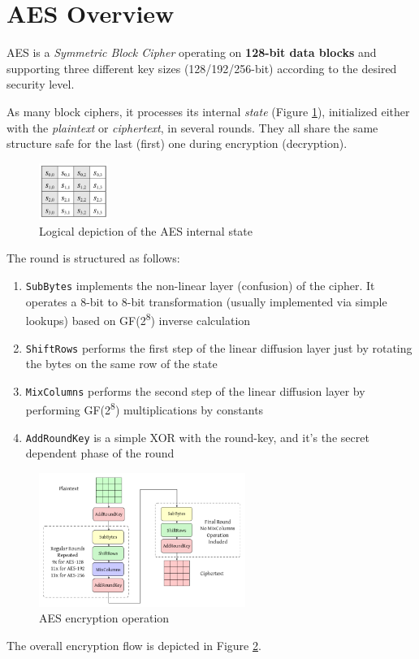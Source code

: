 \section{AES Overview}

AES is a \textit{Symmetric Block Cipher} operating on \textbf{128-bit data blocks}
and supporting three different key sizes (128/192/256-bit) according to the desired
security level.

As many block ciphers, it processes its internal \textit{state} (Figure \ref{fig:state}), initialized either with the
\textit{plaintext} or \textit{ciphertext}, in several rounds. They all share the same
structure safe for the last (first) one during encryption (decryption).

\begin{figure}[h]
  \centering
  \includegraphics[width=0.2\textwidth]{figures/aes_state}
  \caption{Logical depiction of the AES internal state}
  \label{fig:state}
  \centering
\end{figure}

The round is structured as follows:
\begin{enumerate}
  \item \texttt{SubBytes} implements the non-linear layer (confusion) of the cipher. It
operates a 8-bit to 8-bit transformation (usually implemented via simple lookups)
based on GF(2\textsuperscript{8}) inverse calculation
  \item \texttt{ShiftRows} performs the first step of the linear diffusion layer just
by rotating the bytes on the same row of the state
  \item \texttt{MixColumns} performs the second step of the linear diffusion layer
by performing GF(2\textsuperscript{8}) multiplications by constants
  \item \texttt{AddRoundKey} is a simple XOR with the round-key, and it's the secret
dependent phase of the round
\end{enumerate}

\begin{figure}[h]
  \centering
  \includegraphics[width=0.6\textwidth]{figures/aes_encryption}
  \caption{AES encryption operation}
  \label{fig:enc}
\end{figure}
The overall encryption flow is depicted in Figure \ref{fig:enc}.


